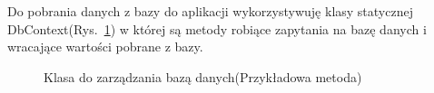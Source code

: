 \begin{flushleft}
    \hspace{5mm} Do pobrania danych z bazy do aplikacji wykorzystywuję klasy statycznej DbContext(Rys.~\ref{fig:db_c_k}) w której są metody robiące zapytania na bazę danych i wracające wartości pobrane z bazy.
    \begin{figure}[H]
    \centering
    \caption{Klasa do zarządzania bazą danych(Przykładowa metoda)}
 
    \label{fig:db_c_k}
    \end{figure}
\end{flushleft}